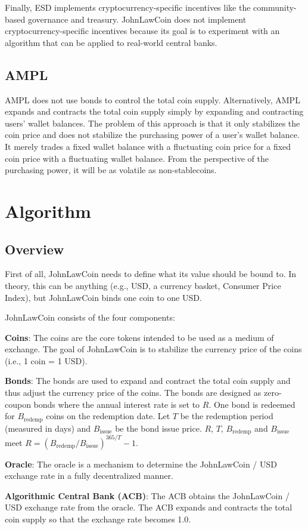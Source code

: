 \documentclass[dvipdfmx,a4paper]{article}
\begin{document}
Finally, ESD implements cryptocurrency-specific incentives like the community-based governance and treasury. JohnLawCoin does not implement cryptocurrency-specific incentives because its goal is to experiment with an algorithm that can be applied to real-world central banks.

\subsection{AMPL}

AMPL does not use bonds to control the total coin supply. Alternatively, AMPL expands and contracts the total coin supply simply by expanding and contracting users' wallet balances. The problem of this approach is that it only stabilizes the coin price and does not stabilize the purchasing power of a user's wallet balance. It merely trades a fixed wallet balance with a fluctuating coin price for a fixed coin price with a fluctuating wallet balance. From the perspective of the purchasing power, it will be as volatile as non-stablecoins.

\section{Algorithm}

\subsection{Overview}

First of all, JohnLawCoin needs to define what its value should be bound to. In theory, this can be anything (e.g., USD, a currency basket, Consumer Price Index), but JohnLawCoin binds one coin to one USD.

JohnLawCoin consists of the four components:

\begin{description}
\item{\textbf{Coins}}: The coins are the core tokens intended to be used as a medium of exchange. The goal of JohnLawCoin is to stabilize the currency price of the coins (i.e., 1 coin = 1 USD).
\item{\textbf{Bonds}}: The bonds are used to expand and contract the total coin supply and thus adjust the currency price of the coins. The bonds are designed as zero-coupon bonds where the annual interest rate is set to $R$. One bond is redeemed for $B_{\mathrm{redemp}}$ coins on the redemption date. Let $T$ be the redemption period (measured in days) and $B_{\mathrm{issue}}$ be the bond issue price. $R$, $T$, $B_{\mathrm{redemp}}$ and $B_{\mathrm{issue}}$ meet $R=(B_{\mathrm{redemp}}/B_{\mathrm{issue}})^{365/T}-1$.
\item{\textbf{Oracle}}: The oracle is a mechanism to determine the JohnLawCoin / USD exchange rate in a fully decentralized manner.
\item{\textbf{Algorithmic Central Bank (ACB)}}: The ACB obtains the JohnLawCoin / USD exchange rate from the oracle. The ACB expands and contracts the total coin supply so that the exchange rate becomes 1.0.
\end{description}
\end{document}

